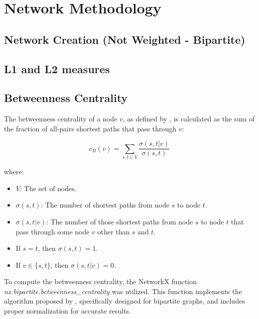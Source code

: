 \section{Network Methodology}

\subsection{Network Creation (Not Weighted - Bipartite)}


\subsection{L1 and L2 measures}




\subsection{Betweenness Centrality}
The betweenness centrality of a node \(v\), as defined by  \cite{Brandes_2008},
is calculated as the sum of the fraction of all-pairs shortest paths that pass through \(v\):

\begin{equation}
  c_B(v) = \sum_{s,t \in V} \frac{\sigma(s, t|v)}{\sigma(s, t)} \label{eq:betweenness}
\end{equation}

where:

\begin{itemize}
  \setlength\itemsep{0.4em} %
  \item \(V\): The set of nodes.
  \item \(\sigma(s, t)\): The number of shortest paths from node \(s\) to node \(t\).
  \item \(\sigma(s, t|v)\): The number of those shortest paths from node \(s\) to node \(t\) that pass
        through some node \(v\) other than \(s\) and \(t\).
  \item If \(s = t\), then \(\sigma(s, t) = 1\).
  \item If \(v \in \{s, t\}\), then \(\sigma(s, t|v) = 0\).
\end{itemize}

To compute the betweenness centrality, the NetworkX function \textit{nx.bipartite.betweenness\_centrality}
was utilized. This function implements the algorithm proposed by  \cite{Brandes_2004},
specifically designed for bipartite graphs, and includes proper normalization for accurate results.

